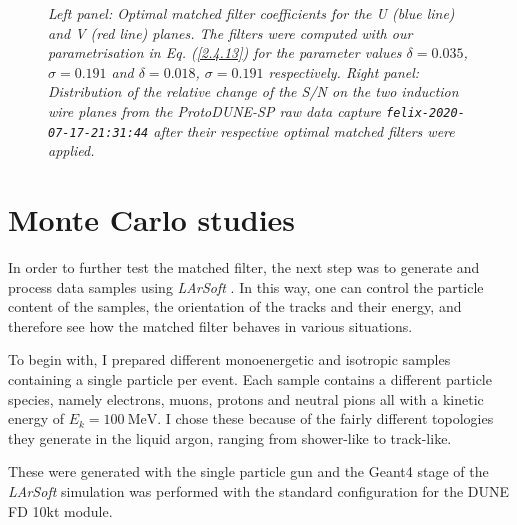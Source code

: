 \begin{figure}[t]
\begin{subfigure}{0.5\textwidth}
	\end{subfigure}
	\caption{\textit{Left panel: Optimal matched filter coefficients for the U (blue line) and V (red line) planes. The filters were computed with our parametrisation in Eq. (\ref{2.4.13}) for the parameter values $\delta = 0.035$, $\sigma = 0.191$ and $\delta = 0.018$, $\sigma = 0.191$ respectively. Right panel: Distribution of the relative change of the S/N on the two induction wire planes from the ProtoDUNE-SP raw data capture \texttt{felix-2020-07-17-21:31:44} after their respective optimal matched filters were applied.}}
	\label{fig:mf_perf}
\end{figure}

\section{Monte Carlo studies}
\label{sec:2.5}

In order to further test the matched filter, the next step was to generate and process data samples using \textit{LArSoft} \cite{Church2013}. In this way, one can control the particle content of the samples, the orientation of the tracks and their energy, and therefore see how the matched filter behaves in various situations.

To begin with, I prepared different monoenergetic and isotropic samples containing a single particle per event. Each sample contains a different particle species, namely electrons, muons, protons and neutral pions all with a kinetic energy of $E_{k} = 100 \ \mathrm{MeV}$. I chose these because of the fairly different topologies they generate in the liquid argon, ranging from shower-like to track-like.

These were generated with the single particle gun and the Geant4 stage of the \textit{LArSoft} simulation \cite{Church2013} was performed with the standard configuration for the DUNE FD 10kt module. 

